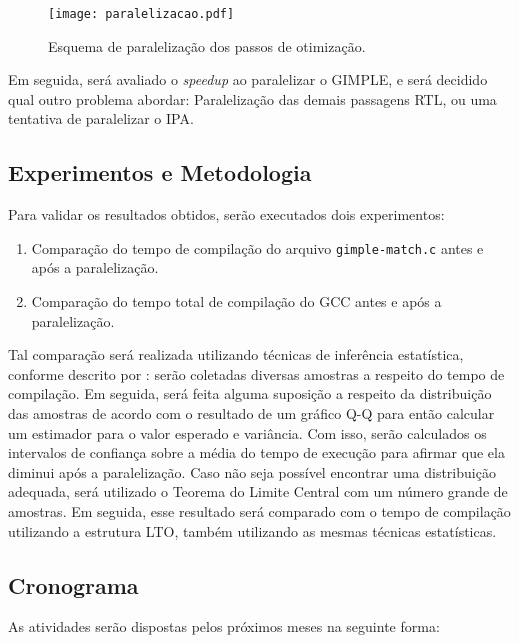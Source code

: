 \begin{figure}[ht]
 \centering
 \texttt{[image: paralelizacao.pdf]}
 \caption{Esquema de paralelização dos passos de otimização.}
 \label{fig:42years}
\end{figure}

Em seguida, será avaliado o \textit{speedup} ao paralelizar o GIMPLE, e
será decidido qual outro problema abordar: Paralelização das demais
passagens RTL, ou uma tentativa de paralelizar o IPA.

\subsection{Experimentos e Metodologia}

Para validar os resultados obtidos, serão executados dois experimentos:
\begin{enumerate}
    \item Comparação do tempo de compilação do arquivo \texttt{gimple-match.c}
        antes e após a paralelização.


    \item Comparação do tempo total de compilação do GCC antes e após a paralelização.
\end{enumerate}
Tal comparação será realizada utilizando
técnicas de inferência estatística, conforme descrito por
\cite{morettin2017estatistica}: serão
coletadas diversas amostras a respeito do tempo de compilação. Em seguida, será feita alguma suposição a respeito da distribuição
das amostras de acordo com o resultado de um gráfico Q-Q para então calcular um estimador
para o valor esperado e variância. Com isso, serão calculados os intervalos de confiança
sobre a média do tempo de execução para afirmar que ela diminui após a paralelização. Caso
não seja possível encontrar uma distribuição adequada, será utilizado o Teorema do Limite
Central com um número grande de amostras. Em seguida, esse resultado será comparado com o
tempo de compilação utilizando a estrutura LTO, também utilizando as mesmas técnicas estatísticas.

\subsection{Cronograma}

As atividades serão dispostas pelos próximos meses na seguinte forma:

